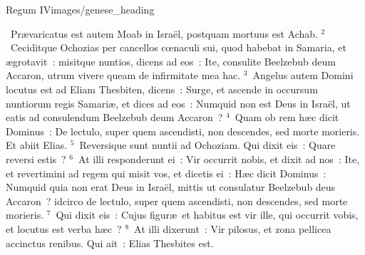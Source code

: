 {Regum IV}{images/genese_heading}

~\lettrine[lines=10,image=true,loversize=0.05,lraise=-0.03]{P}{}r\ae varicatus est autem Moab in Isra\"el, postquam mortuus est Achab.
${}^{2}$~Ceciditque Ochozias per cancellos cœnaculi sui, quod habebat in Samaria, et \ae grotavit~: misitque nuntios, dicens ad eos~: Ite, consulite Beelzebub deum Accaron, utrum vivere queam de infirmitate mea hac.
${}^{3}$~Angelus autem Domini locutus est ad Eliam Thesbiten, dicens~: Surge, et ascende in occursum nuntiorum regis Samari\ae , et dices ad eos~: Numquid non est Deus in Isra\"el, ut eatis ad consulendum Beelzebub deum Accaron~?
${}^{4}$~Quam ob rem h\ae c dicit Dominus~: De lectulo, super quem ascendisti, non descendes, sed morte morieris. Et abiit Elias.
${}^{5}$~Reversique sunt nuntii ad Ochoziam. Qui dixit eis~: Quare reversi estis~?
${}^{6}$~At illi responderunt ei~: Vir occurrit nobis, et dixit ad nos~: Ite, et revertimini ad regem qui misit vos, et dicetis ei~: H\ae c dicit Dominus~: Numquid quia non erat Deus in Isra\"el, mittis ut consulatur Beelzebub deus Accaron~? idcirco de lectulo, super quem ascendisti, non descendes, sed morte morieris.
${}^{7}$~Qui dixit eis~: Cujus figur\ae\ et habitus est vir ille, qui occurrit vobis, et locutus est verba h\ae c~?
${}^{8}$~At illi dixerunt~: Vir pilosus, et zona pellicea accinctus renibus. Qui ait~: Elias Thesbites est.


